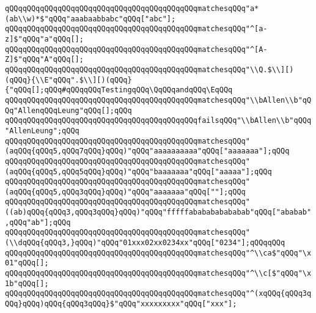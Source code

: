 \verb|qQQqqQQqqQQqqQQqqQQqqQQqqQQqqQQqqQQqqQQqqQQqmatchesqQQq"a*(ab\\w)*$"qQQq"aaabaabbabc"qQQq["abc"];|\newline
\verb|qQQqqQQqqQQqqQQqqQQqqQQqqQQqqQQqqQQqqQQqqQQqmatchesqQQq"^[a-z]$"qQQq"a"qQQq[];|\newline
\verb|qQQqqQQqqQQqqQQqqQQqqQQqqQQqqQQqqQQqqQQqqQQqmatchesqQQq"^[A-Z]$"qQQq"A"qQQq[];|\newline
\verb|qQQqqQQqqQQqqQQqqQQqqQQqqQQqqQQqqQQqqQQqqQQqmatchesqQQq"\\Q.$\\][)(qQQq}{\\E"qQQq".$\\][)(qQQq}{"qQQq[];qQQq#qQQqqQQqTestingqQQq\QqQQqandqQQq\EqQQq|\newline
\verb|qQQqqQQqqQQqqQQqqQQqqQQqqQQqqQQqqQQqqQQqqQQqmatchesqQQq"\\bAllen\\b"qQQq"AllenqQQqLeung"qQQq[];qQQq|\newline
\verb|qQQqqQQqqQQqqQQqqQQqqQQqqQQqqQQqqQQqqQQqqQQqfailsqQQq"\\bAllen\\b"qQQq"AllenLeung";qQQq|\newline
\verb|qQQqqQQqqQQqqQQqqQQqqQQqqQQqqQQqqQQqqQQqqQQqmatchesqQQq"(aqQQq{qQQq5,qQQq7qQQq}qQQq)"qQQq"aaaaaaaaaa"qQQq["aaaaaaa"];qQQq|\newline
\verb|qQQqqQQqqQQqqQQqqQQqqQQqqQQqqQQqqQQqqQQqqQQqmatchesqQQq"(aqQQq{qQQq5,qQQq5qQQq}qQQq)"qQQq"baaaaaaa"qQQq["aaaaa"];qQQq|\newline
\verb|qQQqqQQqqQQqqQQqqQQqqQQqqQQqqQQqqQQqqQQqqQQqmatchesqQQq"(aqQQq{qQQq5,qQQq3qQQq}qQQq)"qQQq"aaaaaaa"qQQq[""];qQQq|\newline
\verb|qQQqqQQqqQQqqQQqqQQqqQQqqQQqqQQqqQQqqQQqqQQqmatchesqQQq"((ab)qQQq{qQQq3,qQQq3qQQq}qQQq)"qQQq"fffffababababababab"qQQq["ababab",qQQq"ab"];qQQq|\newline
\verb|qQQqqQQqqQQqqQQqqQQqqQQqqQQqqQQqqQQqqQQqqQQqmatchesqQQq"(\\dqQQq{qQQq3,}qQQq)"qQQq"01xxx02xx0234xx"qQQq["0234"];qQQqqQQq|\newline
\verb|qQQqqQQqqQQqqQQqqQQqqQQqqQQqqQQqqQQqqQQqqQQqmatchesqQQq"^\\ca$"qQQq"\x01"qQQq[];|\newline
\verb|qQQqqQQqqQQqqQQqqQQqqQQqqQQqqQQqqQQqqQQqqQQqmatchesqQQq"^\\c[$"qQQq"\x1b"qQQq[];|\newline
\verb|qQQqqQQqqQQqqQQqqQQqqQQqqQQqqQQqqQQqqQQqqQQqmatchesqQQq"^(xqQQq{qQQq3qQQq}qQQq)qQQq{qQQq3qQQq}$"qQQq"xxxxxxxxx"qQQq["xxx"];|\newline
